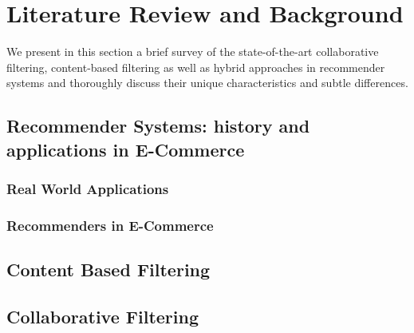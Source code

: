 
\chapter{Literature Review and Background} %
\label{Chapter2} %

We present in this section a brief survey of the state-of-the-art collaborative filtering, content-based filtering as well as hybrid  approaches in recommender systems and thoroughly discuss their unique characteristics and subtle differences.  



\section{Recommender Systems: history and applications in E-Commerce}
\label{chp2-sec1}

\subsection{Real World Applications}
\label{chp2-sec1.1}



\subsection{Recommenders in E-Commerce}
\label{chp2-sec1.2}

\section{Content Based Filtering}
\label{chp2-sec2}

\section{Collaborative Filtering}
\label{chp2-sec3}

